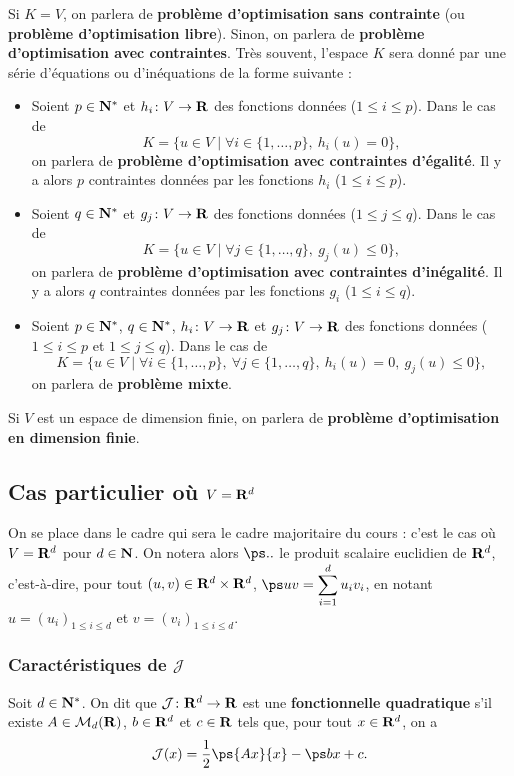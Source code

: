 \documentclass[grape]{../ceri/sty/MasterNotes}
\newcommand\J{\mathcal J}
\begin{document}
Si $K=V$, on parlera de \textbf{problème d'optimisation sans contrainte} (ou \textbf{problème d'optimisation libre}). Sinon, on parlera de \textbf{problème d'optimisation avec contraintes}. Très souvent, l'espace $K$ sera donné par une série d'équations ou d'inéquations de la forme suivante :
\begin{itemize}
    \item Soient $p\in\mathbf{N}^*$ et $h_i\colon V\to\mathbf{R}$ des fonctions données ($1\le i\le p$). Dans le cas de
          \[ K = \{u\in V\mid \forall i\in\{1,\ldots,p\},\ h_i(u)=0\}, \]
          on parlera de \textbf{problème d'optimisation avec contraintes d'égalité}. Il y a alors $p$ contraintes données par les fonctions $h_i$ ($1\le i\le p$).
    \item Soient $q\in\mathbf{N}^*$ et $g_j\colon V\to\mathbf{R}$ des fonctions données ($1\le j\le q$). Dans le cas de
          \[ K = \{u\in V\mid \forall j\in\{1,\ldots,q\},\ g_j(u)\le 0\}, \]
          on parlera de \textbf{problème d'optimisation avec contraintes d'inégalité}. Il y a alors $q$ contraintes données par les fonctions $g_i$ ($1\le i\le q$).
    \item Soient $p\in\mathbf{N}^*$, $q\in\mathbf{N}^*$, $h_i\colon V\to\mathbf{R}$ et $g_j\colon V\to\mathbf{R}$ des fonctions données ($1\le i\le p$ et $1\le j\le q$). Dans le cas de
          \[ K = \{u\in V\mid \forall i\in\{1,\ldots,p\},\ \forall j\in\{1,\ldots,q\},\ h_i(u)=0,\ g_j(u)\le 0\}, \]
          on parlera de \textbf{problème mixte}.
\end{itemize}
Si $V$ est un espace de dimension finie, on parlera de \textbf{problème d'optimisation en dimension finie}.

\subsection{Cas particulier où $V=\mathbf{R}^d$}

On se place dans le cadre qui sera le cadre majoritaire du cours : c'est le cas où $V=\mathbf{R}^d$ pour $d\in\mathbf{N}$. On notera alors $\ps..$ le produit scalaire euclidien de $\mathbf{R}^d$, c'est-à-dire, pour tout $(u,v)\in\mathbf{R}^d\times\mathbf{R}^d$, $\ps uv = \displaystyle\sum_{i=1}^d u_iv_i$, en notant $u=(u_i)_{1\le i\le d}$ et $v=(v_i)_{1\le i\le d}$.

\subsubsection{Caractéristiques de $\J$}

\begin{defin}
    Soit $d\in\mathbf{N}^*$. On dit que $\J\colon\R^d\to\R$ est une \textbf{fonctionnelle quadratique} s'il existe $\mathnormal{A}\in\mathcal M_d(\mathbf{R})$, $b\in\mathbf{R}^d$ et $c\in\mathbf{R}$ tels que, pour tout $x\in\mathbf{R}^d$, on a
    \[ \J(x) = \frac 12\ps{Ax}{x} - \ps bx + c. \]
\end{defin}
\end{document}
